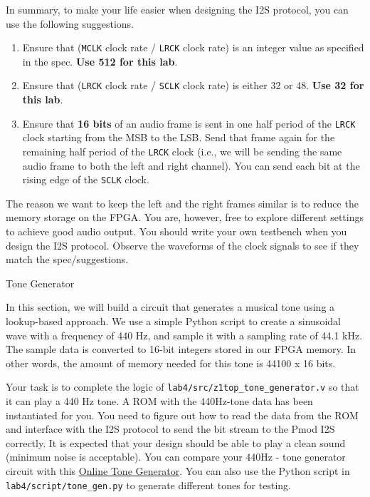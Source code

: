 \documentclass[11pt]{article}
\makeatletter
\renewcommand{\subsection}
{\@startsection {subsection}{1}{0pt}
 {-1ex}
 {0.5ex}
 {\bfseries\normalsize}}
\makeatother
\begin{document}
In summary, to make your life easier when designing the I2S protocol, you can use the following suggestions.

\begin{enumerate}
  \item Ensure that (\verb|MCLK| clock rate / \verb|LRCK| clock rate) is an integer value as specified in the spec. \textbf{Use 512 for this lab}.
  \item Ensure that (\verb|LRCK| clock rate / \verb|SCLK| clock rate) is either 32 or 48. \textbf{Use 32 for this lab}.
  \item Ensure that \textbf{16 bits} of an audio frame is sent in one half period of the \verb|LRCK| clock starting from the MSB to the LSB. Send that frame again for the remaining half period of the \verb|LRCK| clock (i.e., we will be sending the same audio frame to both the left and right channel). You can send each bit at the rising edge of the \verb|SCLK| clock.
\end{enumerate}

The reason we want to keep the left and the right frames similar is to reduce the memory storage on the FPGA. You are, however, free to explore different settings to achieve good audio output. You should write your own testbench when you design the I2S protocol. Observe the waveforms of the clock signals to see if they match the spec/suggestions.

\subsection{Tone Generator}

In this section, we will build a circuit that generates a musical tone using a lookup-based approach. We use a simple Python script to create a sinusoidal wave with a frequency of 440 Hz, and sample it with a sampling rate of 44.1 kHz. The sample data is converted to 16-bit integers stored in our FPGA memory. In other words, the amount of memory needed for this tone is 44100 x 16 bits.

Your task is to complete the logic of \verb|lab4/src/z1top_tone_generator.v| so that it can play a 440 Hz tone. A ROM with the 440Hz-tone data has been instantiated for you. You need to figure out how to read the data from the ROM and interface with the I2S protocol to send the bit stream to the Pmod I2S correctly. It is expected that your design should be able to play a clean sound (minimum noise is acceptable). You can compare your 440Hz - tone generator circuit with this \href{https://www.szynalski.com/tone-generator}{Online Tone Generator}. You can also use the Python script in \verb|lab4/script/tone_gen.py| to generate different tones for testing.
\end{document}
